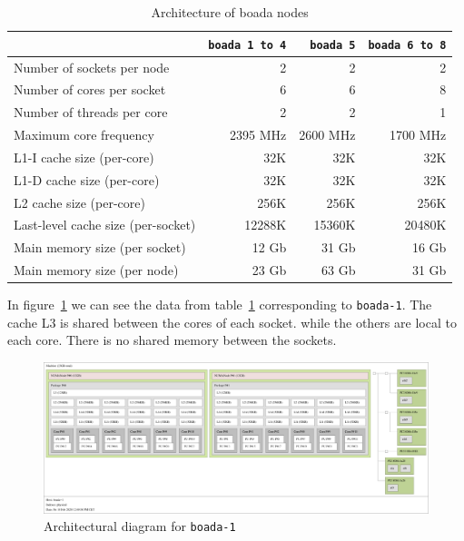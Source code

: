 \begin{table}[H]%
    \centering
    \begin{tabular}{lrrr}

    \toprule
        & \texttt{boada 1 to 4} & \texttt{boada 5} & \texttt{boada 6 to 8} \\
    \midrule
        Number of sockets per node          & 2        & 2        & 2        \\
        Number of cores per socket          & 6        & 6        & 8        \\
        Number of threads per core          & 2        & 2        & 1        \\
        Maximum core frequency              & 2395 MHz & 2600 MHz & 1700 MHz \\
    \addlinespace[1em]
        L1-I cache size (per-core)          & 32K      & 32K      & 32K      \\
        L1-D cache size (per-core)          & 32K      & 32K      & 32K      \\
        L2 cache size (per-core)            & 256K     & 256K     & 256K     \\
        Last-level cache size (per-socket)  & 12288K   & 15360K   & 20480K   \\
    \addlinespace[1em]
        Main memory size (per socket)       & 12 Gb    & 31 Gb    & 16 Gb    \\
        Main memory size (per node)         & 23 Gb    & 63 Gb    & 31 Gb    \\
    \bottomrule

    \end{tabular}
    
    \caption{Architecture of boada nodes}%
    \label{tab:node_arch_and_mem}
\end{table}


In figure~\ref{fig:arch_boada1} we can see the data from table~\ref{tab:node_arch_and_mem} corresponding
to \texttt{boada-1}. The cache L3 is shared between the cores of each socket.
 while the others are local to each core. There is no shared memory between the sockets.

\begin{figure}[H]%
    \centering
    \includegraphics[width=\textwidth]{./data/map-boada-1.pdf}
    \caption{Architectural diagram for \texttt{boada-1}}%
    \label{fig:arch_boada1}
\end{figure}


